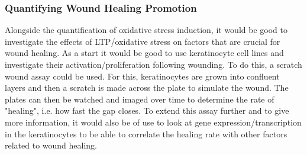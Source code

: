 \documentclass[11pt, oneside]{article}   	%
\newcommand{\toref}[1]{ \textcolor{blue}{\bf{REFERENCE #1}}}
\begin{document}
%
%
%
%
%





\subsubsection{Quantifying Wound Healing Promotion}

Alongside the quantification of oxidative stress induction, it would be good to investigate the effects of LTP/oxidative stress on factors that are crucial for wound healing.
As a start it would be good to use keratinocyte cell lines and investigate their activation/proliferation following wounding.
To do this, a scratch wound assay could be used.
For this, keratinocytes are grown into confluent layers and then a scratch is made across the plate to simulate the wound.
The plates can then be watched and imaged over time to determine the rate of "healing", i.e. how fast the gap closes.
To extend this assay further and to give more information, it would also be of use to look at gene expression/transcription in the keratinocytes to be able to correlate the healing rate with other factors related to wound healing.
\end{document}
